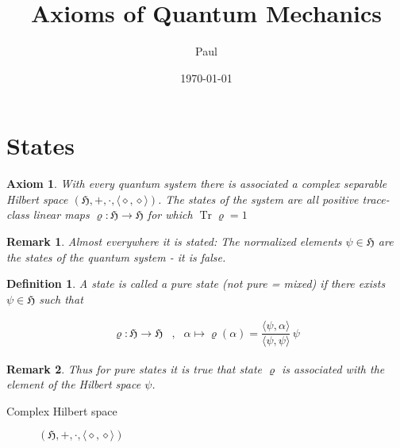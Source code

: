 \documentclass{article}
\title{Axioms of Quantum Mechanics}
\author{Paul}
\date{\today}
\newtheorem{axiom}{Axiom}
\newtheorem{definition}{Definition}
\newtheorem{remark}{Remark}
\DeclareMathOperator{\tr}{Tr}
\begin{document}
\maketitle

\section{States}

\begin{axiom}
With every quantum system there is associated a complex separable Hilbert space $(\mathfrak{H}, +, \cdot, \langle\diamond,\diamond\rangle)$. The states of the system are all positive trace-class linear maps $\varrho:\mathfrak{H}\rightarrow\mathfrak{H}$ for which $\tr\varrho = 1$
\end{axiom}

\begin{remark}
Almost everywhere it is stated:
The normalized elements $\psi\in\mathfrak{H}$ are the states of the quantum system - it is false.
\end{remark}

\begin{definition}
A state is called a pure state (not pure = mixed) if there exists $\psi\in\mathfrak{H}$ such that

\begin{align*}
\varrho:\mathfrak{H}\rightarrow\mathfrak{H} & , & \alpha \mapsto \varrho(\alpha) = \dfrac{\langle\psi,\alpha\rangle}{\langle\psi,\psi\rangle}\,\psi
\end{align*}

\end{definition}

\begin{remark}
Thus for pure states it is true that state $\varrho$ is associated with the element of the Hilbert space $\psi$.
\end{remark}

\begin{description}
\item[Complex Hilbert space] $(\mathfrak{H}, +, \cdot, \langle\diamond,\diamond\rangle)$
\end{description}
\end{document}
